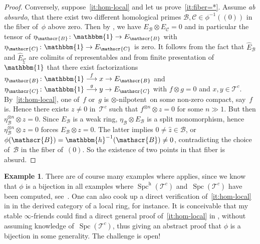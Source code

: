 \documentclass[JEP,XML,SOM,Unicode]{cedram}
\def\To#1{\mathchoice{\xrightarrow{\textstyle\kern4pt#1\kern3pt}}{\stackrel{#1}{\longrightarrow}}{}{}}
\numberwithin{equation}{section}
\theoremstyle{definition}
\newtheorem{Exa}[equation]{Example}
\DeclareMathOperator{\Spc}{Spc}
\newcommand{\cat}[1]{\mathscr{#1}}
\newcommand{\inv}{^{-1}}
\let\xto\To
\newcommand{\unit}{\mathbbm{1}}
\newcommand{\smallh}{\mathrm{h}}
\newcommand{\ababs}{\textit{ab absurdo}}
\newcommand{\cB}{\cat{B}}
\newcommand{\cC}{\cat{C}}
\newcommand{\cT}{\cat{T}}
\newcommand{\EB}{E_{\cB}}
\newcommand{\EC}{E_{\cC}}
\newcommand{\hEB}{\hat E_{\cB}}
\newcommand{\hEC}{\hat E_{\cC}}
\newcommand{\hunit}{\hat\unit}
\newcommand{\potimes}[1]{^{\otimes #1}}
\newcommand{\SpchT}{\Spch(\cat{T}^c)}
\newcommand{\Spch}{\Spc^{\smallh}}
\newcommand{\SpcT}{\Spc(\cat{T}^c)}
\newcommand{\tensnil}{$\otimes$\nobreakdash-nilpotent}
\newcommand{\yoneda}{\mathbbm{h}}
\begin{document}
\begin{appendix}
\begin{proof}
Conversely, suppose~\eqref{it:hom-local} and let us prove~\eqref{it:fiber=*}. Assume \ababs, that there exist two different homological primes $\cB,\cC\in\phi\inv((0))$ in the fiber of~$\phi$ above zero. Then by \cite[Prop.\,5.3]{Balmer20a}, we have $\EB\otimes \EC=0$ and in particular the tensor of $\eta_\cB\colon \unit\to \EB$ with $\eta_\cC\colon \unit \to \EC$ is zero. It follows from the fact that $\hEB$ and $\hEC$ are colimits of representables and from finite presentation of~$\hunit$ that there exist factorizations $\eta_\cB\colon \unit\xto{f} x\to \EB$ and $\eta_\cC\colon \unit\xto{g} y\to \EC$ with $f\otimes g=0$ and $x,y\in\cT^c$. By~\eqref{it:hom-local}, one of~$f$ or~$g$ is \tensnil\ on some non-zero compact, say~$f$ is. Hence there exists $z\neq0$ in~$\cT^c$ such that $f\potimes{n}\otimes z=0$ for some $n\gg1$. But then $\eta_\cB\potimes{n}\otimes z=0$. Since $\EB$ is a weak ring, $\eta_\cB\otimes\EB$ is a split monomorphism, hence $\eta_\cB\potimes{n}\otimes z=0$ forces $\EB\otimes z=0$. The latter implies $0\neq\hat z\in \cB$, or $\phi(\cB)=\yoneda\inv(\cB)\neq 0$, contradicting the choice of~$\cB$ in the fiber of~$(0)$. So the existence of two points in that fiber is absurd.
\end{proof}

\begin{Exa}
\label{exa:local}
There are of course many examples where  applies, since we know that $\phi$ is a bijection in all examples where $\SpchT$ and~$\SpcT$ have been computed, see~\cite[\S5]{Balmer20a}. One can also cook up a direct verification of~\eqref{it:hom-local} in  in the derived category of a local ring, for instance. It is conceivable that my stable $\infty$-friends could find a direct general proof of~\eqref{it:hom-local} in , without assuming knowledge of~$\SpcT$, thus giving an abstract proof that $\phi$ is a bijection in some generality. The challenge is open!
\end{Exa}

\end{appendix}

\backmatter


\end{document}
